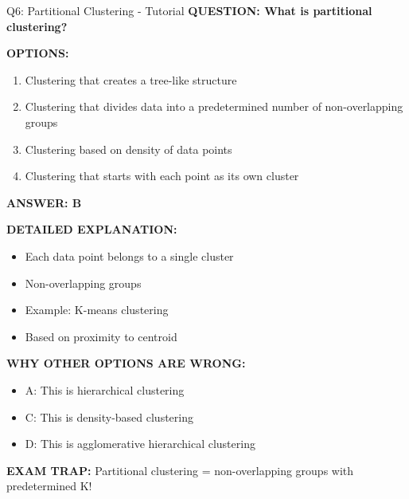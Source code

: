 \documentclass[8pt]{beamer}
\begin{document}
	\begin{frame}{Q6: Partitional Clustering - Tutorial}
		\fontsize{6.5}{7.5}\selectfont
		\textbf{QUESTION: What is partitional clustering?}
		
		\vspace{0.1cm}
		\textbf{OPTIONS:}
		\begin{enumerate}
			\item Clustering that creates a tree-like structure
			\item Clustering that divides data into a predetermined number of non-overlapping groups
			\item Clustering based on density of data points
			\item Clustering that starts with each point as its own cluster
		\end{enumerate}
		
		\vspace{0.1cm}
		\textcolor{myblue}{\textbf{ANSWER: B}}
		
		\vspace{0.1cm}
		\textbf{DETAILED EXPLANATION:}
		\begin{itemize}
			\item Each data point belongs to a single cluster
			\item Non-overlapping groups
			\item Example: K-means clustering
			\item Based on proximity to centroid
		\end{itemize}
		
		\vspace{0.1cm}
		\textcolor{myred}{\textbf{WHY OTHER OPTIONS ARE WRONG:}}
		\begin{itemize}
			\item \textcolor{myred}{A:} This is hierarchical clustering
			\item \textcolor{myred}{C:} This is density-based clustering
			\item \textcolor{myred}{D:} This is agglomerative hierarchical clustering
		\end{itemize}
		
		\textcolor{myred}{\textbf{EXAM TRAP:}} Partitional clustering = \textcolor{myblue}{non-overlapping groups with predetermined K}!
	\end{frame}
	
\end{document}
